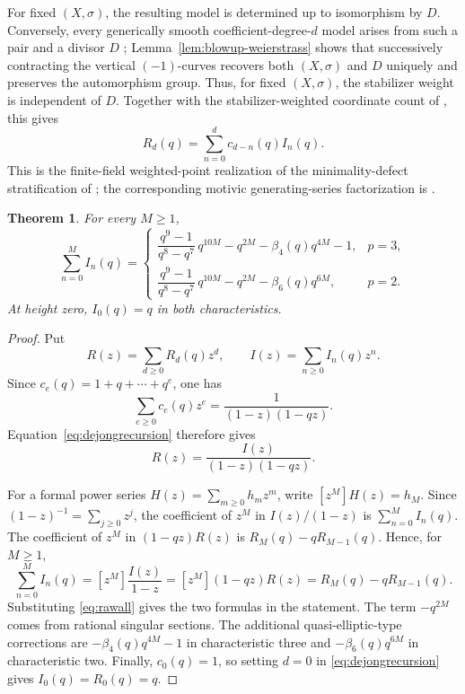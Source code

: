 \documentclass[a4paper,12pt]{amsart}
\newtheorem{thm}{Theorem}[section]
\theoremstyle{definition}
\begin{document}
For fixed $(X,\sigma)$, the resulting model is determined up to isomorphism by $D$.  Conversely, every generically smooth coefficient-degree-$d$ model arises from such a pair and a divisor $D$ \cite[Section~4.11]{dJ2}; Lemma~\ref{lem:blowup-weierstrass} shows that successively contracting the vertical $(-1)$-curves recovers both $(X,\sigma)$ and $D$ uniquely and preserves the automorphism group.  Thus, for fixed $(X,\sigma)$, the stabilizer weight is independent of $D$.  Together with the stabilizer-weighted coordinate count of \cite[Lemma~4.9]{dJ2}, this gives
\begin{equation}\label{eq:dejongrecursion}
R_d(q)
=
\sum_{n=0}^{d}c_{d-n}(q)I_n(q).
\end{equation}
This is the finite-field weighted-point realization of the minimality-defect stratification of \cite[Proposition~6.1 and Corollary~6.2]{BPS}; the corresponding motivic generating-series factorization is \cite[Lemma~8.6, equation~(6)]{BPS}.

\begin{thm}\label{thm:weighted}
For every $M\geq1$,
\[
\sum_{n=0}^M I_n(q)
=
\begin{cases}
\dfrac{q^9-1}{q^8-q^7}\,q^{10M}
-q^{2M}
-\beta_4(q)q^{4M}
-1,
&p=3,\\[3mm]
\dfrac{q^9-1}{q^8-q^7}\,q^{10M}
-q^{2M}
-\beta_6(q)q^{6M},
&p=2.
\end{cases}
\]
At height zero, $I_0(q)=q$ in both characteristics.
\end{thm}

\begin{proof}
Put
\[
R(z)=\sum_{d\geq0}R_d(q)z^d,
\qquad
I(z)=\sum_{n\geq0}I_n(q)z^n.
\]
Since $c_e(q)=1+q+\cdots+q^e$, one has
\[
\sum_{e\geq0}c_e(q)z^e
=
\frac{1}{(1-z)(1-qz)}.
\]
Equation~\eqref{eq:dejongrecursion} therefore gives
\[
R(z)=\frac{I(z)}{(1-z)(1-qz)}.
\]

For a formal power series $H(z)=\sum_{m\geq0}h_mz^m$, write $[z^M]H(z)=h_M$.  Since $(1-z)^{-1}=\sum_{j\geq0}z^j$, the coefficient of $z^M$ in $I(z)/(1-z)$ is $\sum_{n=0}^M I_n(q)$.  The coefficient of $z^M$ in $(1-qz)R(z)$ is $R_M(q)-qR_{M-1}(q)$.  Hence, for $M\geq1$,
\[
\sum_{n=0}^M I_n(q)
=
[z^M]\frac{I(z)}{1-z}
=
[z^M](1-qz)R(z)
=
R_M(q)-qR_{M-1}(q).
\]
Substituting \eqref{eq:rawall} gives the two formulas in the statement. The term $-q^{2M}$ comes from rational singular sections.  The additional quasi-elliptic-type corrections are $-\beta_4(q)q^{4M}-1$ in characteristic three and $-\beta_6(q)q^{6M}$ in characteristic two.  Finally, $c_0(q)=1$, so setting $d=0$ in \eqref{eq:dejongrecursion} gives $I_0(q)=R_0(q)=q$.
\end{proof}
\end{document}
